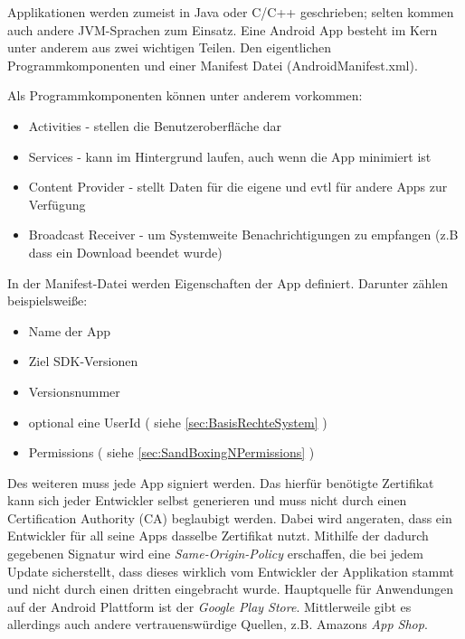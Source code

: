 \begin{flushleft}
	Applikationen werden zumeist in Java oder C/C++ geschrieben; selten kommen auch andere JVM-Sprachen zum Einsatz.
	Eine Android App besteht im Kern unter anderem aus zwei wichtigen Teilen. Den eigentlichen Programmkomponenten und einer Manifest Datei (AndroidManifest.xml).\\
\end{flushleft}
	Als Programmkomponenten können unter anderem vorkommen:
	\begin{itemize}\itemsep0pt
		\item Activities - stellen die Benutzeroberfläche dar
		\item Services - kann im Hintergrund laufen, auch wenn die App minimiert ist
		\item Content Provider - stellt Daten für die eigene und evtl für andere Apps zur Verfügung
		\item Broadcast Receiver - um Systemweite Benachrichtigungen zu empfangen (z.B dass ein Download beendet wurde)
	\end{itemize}
	In der Manifest-Datei werden Eigenschaften der App definiert. Darunter zählen beispielsweiße:
	\begin{itemize}\itemsep0pt
		\item Name der App
		\item Ziel SDK-Versionen
		\item Versionsnummer
		\item optional eine UserId ( siehe \ref*{sec:BasisRechteSystem} )
		\item Permissions ( siehe \ref*{sec:SandBoxingNPermissions} )
	\end{itemize}
	Des weiteren muss jede App signiert werden. Das hierfür benötigte Zertifikat kann sich jeder Entwickler selbst generieren und muss nicht durch einen Certification Authority (CA) beglaubigt werden. Dabei wird angeraten, dass ein Entwickler für all seine Apps dasselbe Zertifikat nutzt. Mithilfe der dadurch gegebenen Signatur wird eine \textit{Same-Origin-Policy} erschaffen, die bei jedem Update sicherstellt, dass dieses wirklich vom Entwickler der Applikation stammt und nicht durch einen dritten eingebracht wurde.
	Hauptquelle für Anwendungen auf der Android Plattform ist der \textit{Google Play Store}. Mittlerweile gibt es allerdings auch andere vertrauenswürdige Quellen, z.B. Amazons \textit{App Shop}.